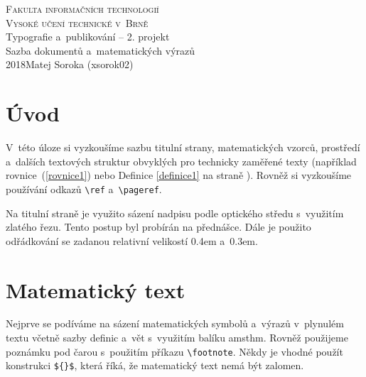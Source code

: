 \documentclass[a4paper,11pt,twocolumn]{article}
\theoremstyle{definition}
\theoremstyle{definition}
\theoremstyle{definition}
\begin{document}
\begin{titlepage}
  \begin{center}
    \Large
    \textsc{\Huge Fakulta informačních technologií\\[3.75mm]
    Vysoké učení technické v~Brně}\\
    {\LARGE Typografie a~publikování -- 2. projekt\\[1.5mm]
    Sazba dokumentů a~matematických výrazů}\\
    \Large{2018}\hfill Matej Soroka (xsorok02)
  \end{center}
\end{titlepage}

\section*{Úvod}
V~této úloze si vyzkoušíme sazbu titulní strany, matematických vzorců, prostředí a~dalších textových struktur obvyklých pro technicky zaměřené texty (například rovnice~(\ref{rovnice1}) nebo Definice \ref{definice1} na straně \pageref{definice1}). Rovněž si vyzkoušíme používání
odkazů \verb|\ref| a~\verb|\pageref|.

Na titulní straně je využito sázení nadpisu podle optického středu s~využitím zlatého řezu. Tento postup byl probírán na přednášce. Dále je použito odřádkování se zadanou relativní velikostí 0.4em a~0.3em.

\section{Matematický text}
Nejprve se podíváme na sázení matematických symbolů a~výrazů v~plynulém textu včetně sazby definic a~vět s~využitím balíku {\ttfamily amsthm}. Rovněž použijeme poznámku pod čarou s~použitím příkazu \verb|\footnote|. Někdy je vhodné použít konstrukci \verb|${}$|, která říká, že matematický text nemá být zalomen.
\end{document}
